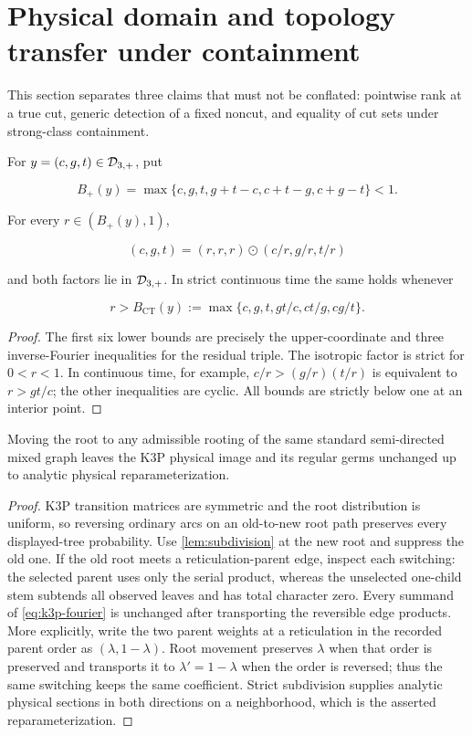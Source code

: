 \section{Physical domain and topology transfer under containment}
\label{sec:physical-topology}

This section separates three claims that must not be conflated: pointwise
rank at a true cut, generic detection of a fixed noncut, and equality of cut
sets under strong-class containment.

\begin{lemma}\label{lem:subdivision}
For \(y=(c,g,t)\in\mathcal D_{3,+}\), put

\[
 B_+(y)=\max\{c,g,t,g+t-c,c+t-g,c+g-t\}<1.
\]

For every \(r\in(B_+(y),1)\),

\[
 (c,g,t)=(r,r,r)\odot(c/r,g/r,t/r)
\]

and both factors lie in \(\mathcal D_{3,+}\).  In strict continuous time the same holds
whenever

\[
 r> B_{\mathrm{CT}}(y)
 :=\max\{c,g,t,gt/c,ct/g,cg/t\}.
\]
\end{lemma}

\begin{proof}
The first six lower bounds are precisely the upper-coordinate and three
inverse-Fourier inequalities for the residual triple.  The isotropic factor
is strict for \(0<r<1\).  In continuous time, for example,
\(c/r>(g/r)(t/r)\) is equivalent to \(r>gt/c\); the other inequalities are
cyclic.  All bounds are strictly below one at an interior point.
\end{proof}

\begin{lemma}\label{lem:root-movement}
Moving the root to any admissible rooting of the same standard semi-directed
mixed graph leaves the K3P physical image and its regular germs unchanged up
to analytic physical reparameterization.
\end{lemma}

\begin{proof}
K3P transition matrices are symmetric and the root distribution is uniform,
so reversing ordinary arcs on an old-to-new root path preserves every
displayed-tree probability.  Use \cref{lem:subdivision} at the new root and
suppress the old one.  If the old root meets a reticulation-parent edge,
inspect each switching: the selected parent uses only the serial product,
whereas the unselected one-child stem subtends all observed leaves and has
total character zero.  Every summand of \eqref{eq:k3p-fourier} is unchanged
after transporting the reversible edge products.  More explicitly, write the
two parent weights at a reticulation in the recorded parent order as
\((\lambda,1-\lambda)\).  Root movement preserves \(\lambda\) when that order
is preserved and transports it to \(\lambda'=1-\lambda\) when the order is
reversed; thus the same switching keeps the same coefficient.  Strict
subdivision supplies analytic physical
sections in both directions on a neighborhood, which is the asserted
reparameterization.
\end{proof}

